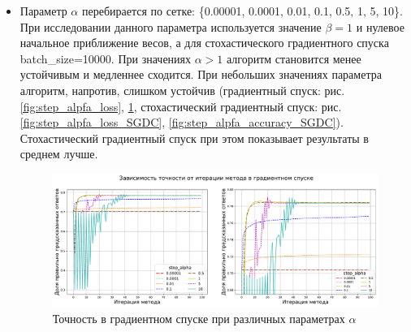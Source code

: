 \documentclass{article}
\begin{document}
\begin{itemize}
\item
Параметр $\alpha$ перебирается по сетке: \{0.00001, 0.0001, 0.01, 0.1, 0.5, 1, 5, 10\}. При исследовании данного параметра используется значение $\beta=1$ и нулевое начальное приближение весов, а для стохастического градиентного спуска batch\_size=10000. При значениях $\alpha > 1$ алгоритм становится менее устойчивым и медленнее сходится. При небольших значениях параметра алгоритм, напротив, слишком устойчив (градиентный спуск: рис. \ref{fig:step_alpfa_loss}, \ref{fig:step_alpfa_accuracy}, стохастический градиентный спуск: рис. \ref{fig:step_alpfa_loss_SGDC}, \ref{fig:step_alpfa_accuracy_SGDC}). Стохастический градиентный спуск при этом показывает результаты в среднем лучше.

\begin{figure}[H]
    \centering
    \includegraphics[width=14cm]{TASK2 step_alpha accuracy.pdf}
    \caption{Точность в градиентном спуске при различных параметрах $\alpha$}
    \label{fig:step_alpfa_accuracy}
\end{figure}



\end{itemize}
\end{document}
